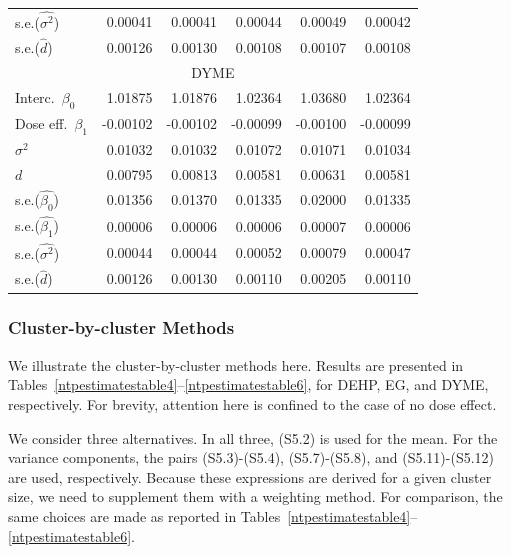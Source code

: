 \documentclass[11pt,a5paper,twoside]{book}
\begin{document}
\begin{table}[!t]
\begin{center}
{\begin{tabular}{lrrrrr}
 s.e.($\widehat{\sigma^2}$) & 0.00041 & 0.00041 & 0.00044 & 0.00049 & 0.00042 \\
 s.e.($\widehat{d}$) & 0.00126 & 0.00130 & 0.00108 & 0.00107 & 0.00108 \\
\hline\hline
\multicolumn{6}{c}{{DYME}}\\
\hline
Interc.\ $\beta_0$& 1.01875 & 1.01876 & 1.02364 & 1.03680 & 1.02364 \\
 Dose eff.\ $\beta_1$ & -0.00102 & -0.00102 & -0.00099 & -0.00100 & -0.00099 \\
 $\sigma^2$ & 0.01032 & 0.01032 & 0.01072 & 0.01071 & 0.01034 \\
$d$ & 0.00795 & 0.00813 & 0.00581 & 0.00631 & 0.00581 \\
\hline
s.e.($\widehat{\beta_0}$) & 0.01356 & 0.01370 & 0.01335 & 0.02000 & 0.01335 \\
s.e.($\widehat{\beta_1}$) & 0.00006 & 0.00006 & 0.00006 & 0.00007 & 0.00006 \\
s.e.($\widehat{\sigma^2}$) & 0.00044 & 0.00044 & 0.00052 & 0.00079 & 0.00047 \\
 s.e.($\widehat{d}$) & 0.00126 & 0.00130 & 0.00110 & 0.00205 & 0.00110 \\
\hline\hline
\end{tabular}}
\end{center}
\end{table}

\subsubsection{Cluster-by-cluster Methods}
\label{cbc}

We illustrate the cluster-by-cluster methods here. Results are 
presented in Tables~\ref{ntpestimatestable4}--\ref{ntpestimatestable6}, 
for DEHP, EG, and DYME, respectively. For brevity, attention here is 
confined to the case of no dose effect.

We consider three alternatives. In all three, (S5.2)
is used for the mean. For the variance components, 
the pairs (S5.3)-(S5.4), (S5.7)-(S5.8), and (S5.11)-(S5.12)
are used, respectively. Because 
these expressions are derived for a given cluster size, 
we need to supplement them with a weighting method. For comparison, the 
same choices are made as reported in Tables~\ref{ntpestimatestable4}--\ref{ntpestimatestable6}.
\end{document}
